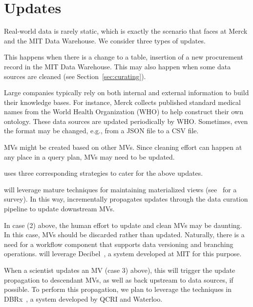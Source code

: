 \section{Updates}
\label{sec:updates}

Real-world data is rarely static, which is exactly the scenario that \dcv faces at Merck and the MIT Data Warehouse.  We consider three types of updates.

 This happens when there is a change to a table, \eg insertion of a new procurement record in the MIT Data Warehouse. This may also happen when some data sources are cleaned (see Section~\ref{sec:curating}).


 Large companies typically rely on both internal and external information to build their knowledge bases. For instance, Merck collects published standard medical names from the World Health Organization (WHO) to help construct their own ontology. These data sources are updated periodically by WHO.  Sometimes, even the format may be changed, e.g., from a JSON file to a CSV file.


 MVs might be created based on other MVs.  Since cleaning effort can happen at any place in a query plan, MVs may need to be updated.


\dcv uses three corresponding strategies to cater for the above updates.


 \dcv will leverage mature techniques for maintaining materialized views (see~\cite{DBLP:journals/debu/GuptaM95} for a survey).  In this way, \dcv incrementally propagates updates through the data curation pipeline to update downstream MVs.




  In case (2) above, the human effort to update and clean MVs may be daunting. In this case, MVs should be discarded rather than updated. Naturally, there is a need for a workflow component that supports data versioning and branching operations. \dcv will leverage Decibel~\cite{DBLP:journals/pvldb/MaddoxGEMPD16}, a system developed at MIT for this purpose.

 When a scientist updates an MV (case 3) above), this will trigger the update propagation to descendant MVs, as well as back upstream to data sources, if possible. To perform this propagation, we plan to leverage the techniques in DBRx~\cite{DBLP:conf/sigmod/ChalamallaIOP14}, a system developed by QCRI and Waterloo.



